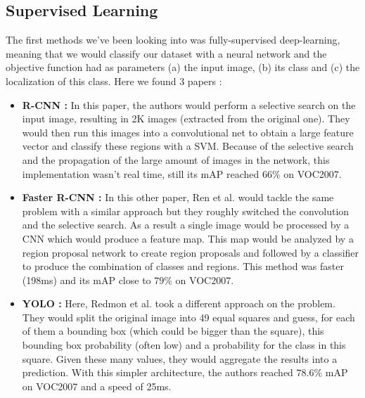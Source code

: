 		\subsection{Supervised Learning}
		\label{sub:supervised_learning}
			The first methods we've been looking into was fully-supervised deep-learning, meaning that we would classify our dataset with a neural network and the objective function had as parameters (a) the input image, (b) its class and (c) the localization of this class. Here we found 3 papers :
			\begin{itemize}
				\item \textbf{R-CNN\cite{girshick2014rich} :} In this paper, the authors would perform a selective search on the input image, resulting in 2K images (extracted from the original one). They would then run this images into a convolutional net to obtain a large feature vector and classify these regions with a SVM. Because of the selective search and the propagation of the large amount of images in the network, this implementation wasn't real time, still its mAP reached $66\%$ on VOC2007.
				\item \textbf{Faster R-CNN\cite{ren2015faster} : } In this other paper, Ren et al. would tackle the same problem with a similar approach but they roughly switched the convolution and the selective search. As a result a single image would be processed by a CNN which would produce a feature map. This map would be analyzed by a region proposal network to create region proposals and followed by a classifier to produce the combination of classes and regions. This method was faster (198ms) and its mAP close to $79\%$ on VOC2007.
				\item \textbf{YOLO\cite{redmon2015you} :} Here, Redmon et al. took a different approach on the problem. They would split the original image into 49 equal squares and guess, for each of them a bounding box (which could be bigger than the square), this bounding box probability (often low) and a probability for the class in this square. Given these many values, they would aggregate the results into a prediction. With this simpler architecture, the authors reached $78.6\%$ mAP on VOC2007 and a speed of 25ms.
			\end{itemize}

